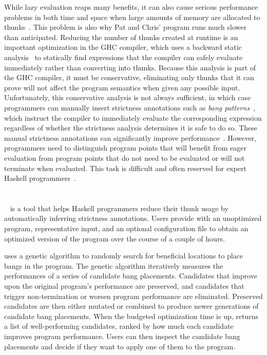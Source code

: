 While lazy evaluation reaps many benefits, it can also cause serious
performance problems in both time and space when large amounts of
memory are allocated to thunks~\cite{Jones94,Santos98,Ennals03}. This problem is
also why Pat and Chris' program runs much slower than anticipated.
Reducing the number of thunks created at runtime is an important
optimization in the GHC compiler, which uses a backward static
analysis~\cite{Sergey14} to statically find expressions that the
compiler can safely evaluate immediately rather than converting into
thunks. Because this analysis is part of the GHC compiler, it must be
conservative, eliminating only thunks that it can prove will not
affect the program semantics when given any possible input.
Unfortunately, this conservative analysis is not always sufficient, in
which case programmers can manually insert strictness annotations such
as \textit{bang patterns}~\cite{bang}, which instruct the compiler to
immediately evaluate the corresponding expression regardless of
whether the strictness analysis determines it is safe to do so. These
manual strictness annotations can significantly improve
performance~\cite[Chapter~25]{rwh}. However, programmers need to
distinguish program points that will benefit from eager evaluation
from program points that do not need to be evaluated or will not
terminate when evaluated. This task is difficult and often reserved
for expert Haskell programmers~\cite{Mitchell13}.


\section{\Ao}

\Ao~\cite{autobahn-wang} is a tool that helps Haskell programmers
reduce their thunk usage by automatically inferring strictness
annotations. Users provide \Ao{} with an unoptimized
program, representative input, and an optional configuration file to
obtain an optimized version of the program over the course of a couple
of hours.

\Ao{} uses a genetic algorithm to randomly search for
beneficial locations to place bangs in the program. The genetic
algorithm iteratively measures the performances of a series of
candidate bang placements. Candidates that improve upon the original
program's performance are preserved, and candidates that trigger
non-termination or worsen program performance are
eliminated. Preserved candidates are then either mutated or combined to produce newer generations of candidate bang placements. When the budgeted optimization time is up, \Ao{} returns a list
of well-performing candidates, ranked by how much each candidate
improves program performance. Users can then inspect the candidate
bang placements and decide if they want to apply one of them to the
program.

